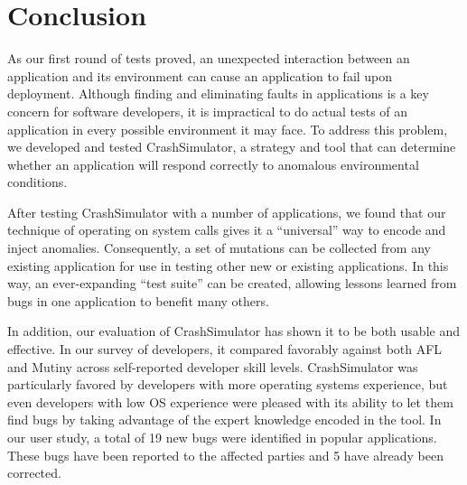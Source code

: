 \section{Conclusion}
\label{SEC:conclusion}

As our first round of tests proved, an unexpected interaction between an
application and its environment can cause
an application to fail upon deployment.
Although finding and eliminating
faults in applications is a key concern for software developers, it is
impractical to do actual tests of an application in every possible
environment it may face.
To address this problem, we developed and tested
CrashSimulator, a strategy and tool
that can determine whether an application will
respond correctly to anomalous environmental conditions.

After testing CrashSimulator with a number of
applications, we found that our technique of
operating on system calls gives it a ``universal'' way to
encode and inject anomalies. Consequently, a set of mutations can be
collected from any existing application for use in testing other new or
existing applications. In this way, an ever-expanding ``test suite'' can be
created, allowing lessons learned from bugs in one application to benefit
many others.

In addition, our evaluation of CrashSimulator has shown it to be both usable and
effective.  In our survey of developers, it compared favorably
against both AFL and Mutiny across self-reported developer skill levels.
CrashSimulator was particularly favored by developers with more operating
systems experience, but even developers with low OS experience were pleased
with its ability to let them find bugs by taking advantage of
the expert knowledge encoded in the tool.
In our user study, a total of
19 new bugs were identified in popular applications.
These bugs have been reported to the
affected parties and 5 have already been corrected.


